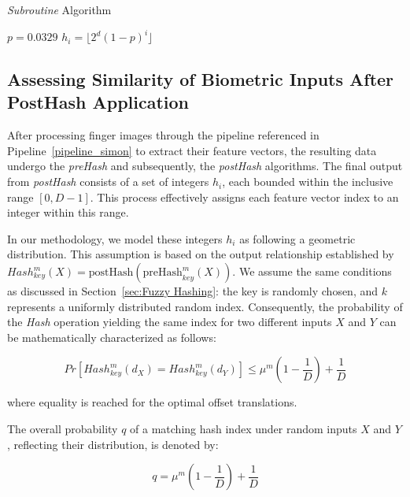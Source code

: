     \begin{algorithm}
    \begin{algorithmic}[1]
    \caption{\textit{Subroutine} Algorithm}
    \label{Subroutine Algorithm}
    \State $p = 0.0329$
    \State $h_i = \lfloor 2^d (1-p)^{i} \rfloor$
    \State {}
    \EndFunction
    \end{algorithmic}
    \end{algorithm}

\subsection{Assessing Similarity of Biometric Inputs After PostHash Application}
\label{sec:q}

After processing finger images through the pipeline referenced in Pipeline~\ref{pipeline_simon} to extract their feature vectors, the resulting data undergo the \textit{preHash} and subsequently, the \textit{postHash} algorithms. The final output from \textit{postHash} consists of a set of integers \( h_i \), each bounded within the inclusive range \([0, D-1]\). This process effectively assigns each feature vector index to an integer within this range.

In our methodology, we model these integers \( h_i \) as following a geometric distribution. This assumption is based on the output relationship established by \( Hash_{key}^m(X) = \text{postHash}(\text{preHash}_{key}^m(X)) \). We assume the same conditions as discussed in Section~\ref{sec:Fuzzy Hashing}: the key is randomly chosen, and \(k\) represents a uniformly distributed random index. Consequently, the probability of the \textit{Hash} operation yielding the same index for two different inputs \(X\) and \(Y\) can be mathematically characterized as follows:

\[Pr[Hash_{key}^m(d_X) = Hash_{key}^m(d_Y)] \leq \mu^m(1 - \frac{1}{D}) + \frac{1}{D}\]

where equality is reached for the optimal offset translations.

The overall probability \( q \) of a matching hash index under random inputs \( X \) and \( Y \), reflecting their distribution, is denoted by:

\[
\label{eq:q_formula}
q = \mu^m(1 - \frac{1}{D}) + \frac{1}{D}
\]


